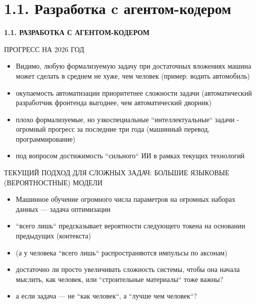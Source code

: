 \documentclass[aspectratio=169]{beamer}
\begin{document}
    \section{1.1. Разработка c агентом-кодером}
    {
    \begin{frame}
        \centering
        \vspace{2cm}
	    {\huge\headerfont\bfseries 1.1. РАЗРАБОТКА С АГЕНТОМ-КОДЕРОМ}
    \end{frame}
	
	
	\begin{frame}{ПРОГРЕСС НА 2026 ГОД}
		\begin{itemize}
			\item [-] Видимо, любую формализуемую задачу при достаточных вложениях машина может сделать в среднем не хуже, чем человек (пример: водить автомобиль)
			\item [-] окупаемость автоматизации приоритетнее сложности задачи (автоматический разработчик фронтенда выгоднее, чем автоматический дворник)
			\item [-] плохо формализуемые, но узкоспециальные ``интеллектуальные`` задачи - огромный прогресс за последние три года (машинный перевод, программирование)
			\item [-] под вопросом достижимость ``сильного`` ИИ в рамках текущих технологий
		\end{itemize}
	\end{frame}
	
	
	\begin{frame}{ТЕКУЩИЙ ПОДХОД ДЛЯ СЛОЖНЫХ ЗАДАЧ: БОЛЬШИЕ ЯЗЫКОВЫЕ (ВЕРОЯТНОСТНЫЕ) МОДЕЛИ}
		\begin{itemize}
		   \item [-] Машинное обучение огромного числа параметров на огромных наборах данных --- задача оптимизации
	       \item [-] ``всего лишь`` предсказывает вероятности следующего токена на основании предыдущих (контекста)
	       \item [-] (а у человека ``всего лишь`` распространяются импульсы по аксонам) 
	       \item [-] достаточно ли просто увеличивать сложность системы, чтобы она начала мыслить, как человек, или ``строительные материалы`` тоже важны?
	       \item [-] а если задача --- не ``как человек``, а ``лучше чем человек``?
	
        \end{itemize}
    \end{frame}
	
}
\end{document}
